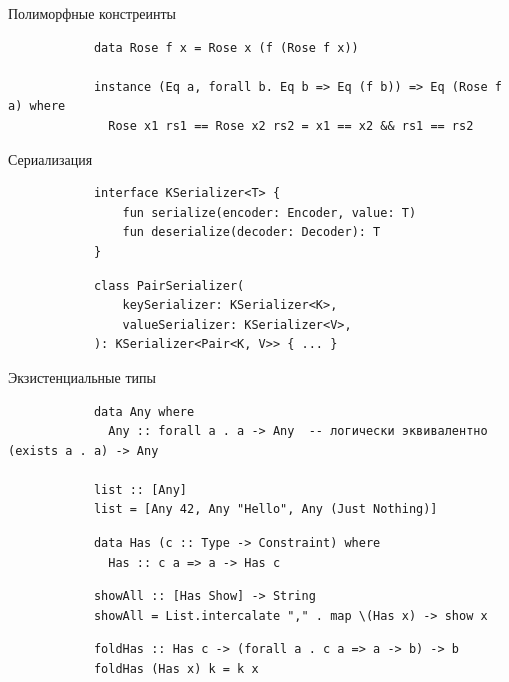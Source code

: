     \begin{frame}[fragile]{Полиморфные констреинты}
        \pause
        \begin{verbatim}
            data Rose f x = Rose x (f (Rose f x))

            instance (Eq a, forall b. Eq b => Eq (f b)) => Eq (Rose f a) where
              Rose x1 rs1 == Rose x2 rs2 = x1 == x2 && rs1 == rs2
        \end{verbatim}
    \end{frame}


    \begin{frame}[fragile]{Сериализация}
        \pause
        \begin{verbatim}
            interface KSerializer<T> {
                fun serialize(encoder: Encoder, value: T)
                fun deserialize(decoder: Decoder): T
            }
        \end{verbatim}
        \pause\vspace{1em}
        \begin{verbatim}
            class PairSerializer(
                keySerializer: KSerializer<K>,
                valueSerializer: KSerializer<V>,
            ): KSerializer<Pair<K, V>> { ... }
        \end{verbatim}
    \end{frame}

    \begin{frame}[fragile]{Экзистенциальные типы}
        \pause
        \begin{verbatim}
            data Any where
              Any :: forall a . a -> Any  -- логически эквивалентно (exists a . a) -> Any

            list :: [Any]
            list = [Any 42, Any "Hello", Any (Just Nothing)]
        \end{verbatim}
        \pause\vspace{1em}
        \begin{verbatim}
            data Has (c :: Type -> Constraint) where
              Has :: c a => a -> Has c
        \end{verbatim}
        \pause\vspace{1em}
        \begin{verbatim}
            showAll :: [Has Show] -> String
            showAll = List.intercalate "," . map \(Has x) -> show x
        \end{verbatim}
        \pause\vspace{1em}
        \begin{verbatim}
            foldHas :: Has c -> (forall a . c a => a -> b) -> b
            foldHas (Has x) k = k x
        \end{verbatim}
    \end{frame}

